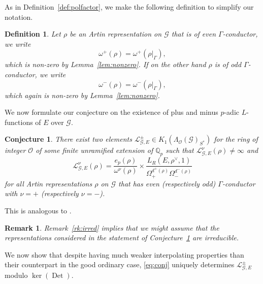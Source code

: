 \documentclass{amsart}
\newtheorem{remark}[theorem]{Remark}
\newtheorem{definition}[theorem]{Definition}
\newtheorem{conjecture}[theorem]{Conjecture}
\begin{document}
As in Definition~\ref{def:polfactor}, we make the following definition to simplify our notation.

\begin{definition}
Let $\rho$ be an Artin representation on ${\mathcal{G}}$ that is of even $\Gamma$-conductor, we write
\[
\omega^+(\rho)=\omega^+(\rho|_\Gamma),
\]
which is non-zero by Lemma~\ref{lem:nonzero}. If on the other hand $\rho$ is of odd $\Gamma$-conductor, we write
\[
\omega^-(\rho)=\omega^-(\rho|_\Gamma),
\]
which again is non-zero by Lemma~\ref{lem:nonzero}.
\end{definition}

 We now formulate our conjecture on the existence of plus and minus $p$-adic $L$-functions of $E$ over ${\mathcal{G}}$.
 
 
\begin{conjecture}\label{conj:exist}
There exist two elements ${\mathcal{L}}_{{\mathcal{G}},E}^\pm\in K_1(\Lambda_{\mathcal{O}}({\mathcal{G}})_{S^*})$ for the ring of integer ${\mathcal{O}}$ of some finite unramified extension of ${{\mathbb Q}_p}$ such that ${\mathcal{L}}_{{\mathcal{G}},E}^\nu(\rho)\ne\infty$ and
\begin{equation}\label{eq:conj}
{\mathcal{L}}_{{\mathcal{G}},E}^\nu(\rho)=\frac{e_p(\rho)}{\omega^\nu(\rho)}\times\frac{L_R(E,\rho^\vee,1)}{\Omega_+^{d^+(\rho)}\Omega_-^{d^-(\rho)}}
\end{equation}
for all Artin representations $\rho$ on ${\mathcal{G}}$ that has even (respectively odd) $\Gamma$-conductor with $\nu=+$ (respectively $\nu=-$).
\end{conjecture}

This is analogous to \cite[Conjecture~5.7]{CKFVS}. 
\begin{remark}\label{rk:sameirred}
Remark~\ref{rk:irred} implies that we might assume that the representations considered in the statement of Conjecture~\ref{conj:exist} are irreducible.
\end{remark}

We now show that despite having much weaker interpolating properties than their counterpart in the good ordinary case, \eqref{eq:conj} uniquely determines ${\mathcal{L}}_{{\mathcal{G}},E}^\pm$ modulo $\ker(\operatorname{Det})$.
\end{document}
